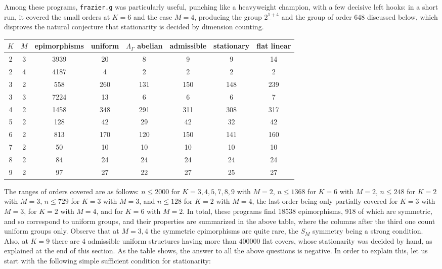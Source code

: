 \documentclass[12pt]{amsart}
\theoremstyle{definition}
\begin{document}
Among these programs, {\tt frazier.g} was particularly useful, punching like a heavyweight champion, with a few decisive left hooks: in a short run, it covered the small orders at $K=6$ and the case $M=4$, producing the group $2^{1+4}_-$ and the group of order 648 discussed below, which disproves the natural conjecture that stationarity is decided by dimension counting.

\medskip

\begin{center}
\small
\renewcommand{\arraystretch}{1.1}
\begin{tabular}{|c|c|c|c|c|c|c|c|}
\hline
$K$&$M$&epimorphisms&uniform&$\Lambda_\Gamma$ abelian&admissible&stationary&flat linear\\
\hline
2&3&3939&20&8&9&9&14\\
2&4&4187&4&2&2&2&2\\
3&2&558&260&131&150&148&239\\
3&3&7224&13&6&6&6&7\\
4&2&1458&348&291&311&308&317\\
5&2&128&42&29&42&32&42\\
6&2&813&170&120&150&141&160\\
7&2&50&10&10&10&10&10\\
8&2&84&24&24&24&24&24\\
9&2&97&27&22&27&25&27\\
\hline
\end{tabular}
\end{center}

\bigskip

The ranges of orders covered are as follows: $n\leq2000$ for $K=3,4,5,7,8,9$ with $M=2$, $n\leq1368$ for $K=6$ with $M=2$, $n\leq248$ for $K=2$ with $M=3$, $n\leq729$ for $K=3$ with $M=3$, and $n\leq128$ for $K=2$ with $M=4$, the last order being only partially covered for $K=3$ with $M=3$, for $K=2$ with $M=4$, and for $K=6$ with $M=2$. In total, these programs find 18538 epimorphisms, 918 of which are symmetric, and so correspond to uniform groups, and their properties are summarized in the above table, where the columns after the third one count uniform groups only. Observe that at $M=3,4$ the symmetric epimorphisms are quite rare, the $S_M$ symmetry being a strong condition. Also, at $K=9$ there are 4 admissible uniform structures having more than $400000$ flat covers, whose stationarity was decided by hand, as explained at the end of this section. As the table shows, the answer to all the above questions is negative. In order to explain this, let us start with the following simple sufficient condition for stationarity:
\end{document}
